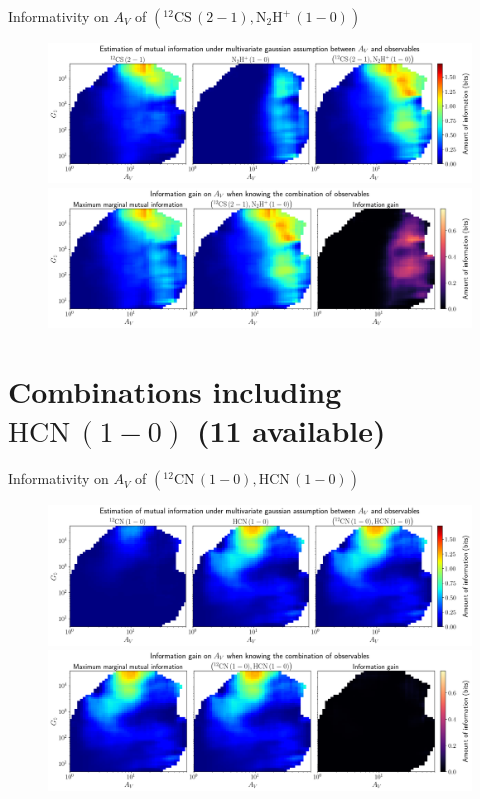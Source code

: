 \documentclass{beamer}
\begin{document}
\begin{frame}{Informativity on $A_V$ of $\left(\mathrm{^{12}CS\,(2-1)},\mathrm{N_2H^+\,(1-0)}\right)$}
    \begin{figure}
        \centering
        \includegraphics[width=0.95\linewidth]{../linearinfo/av__12cs21_n2hp10_linearinfo.png}
        \vfill
        \includegraphics[width=0.95\linewidth]{../linearinfo/av__12cs21_n2hp10_linearinfo_gain.png}
    \end{figure}
\end{frame}

\section{Combinations including $\mathrm{HCN\,(1-0)}$ (11 available)}

\begin{frame}{Informativity on $A_V$ of $\left(\mathrm{^{12}CN\,(1-0)},\mathrm{HCN\,(1-0)}\right)$}
    \begin{figure}
        \centering
        \includegraphics[width=0.95\linewidth]{../linearinfo/av__12cn10_hcn10_linearinfo.png}
        \vfill
        \includegraphics[width=0.95\linewidth]{../linearinfo/av__12cn10_hcn10_linearinfo_gain.png}
    \end{figure}
\end{frame}
\end{document}
